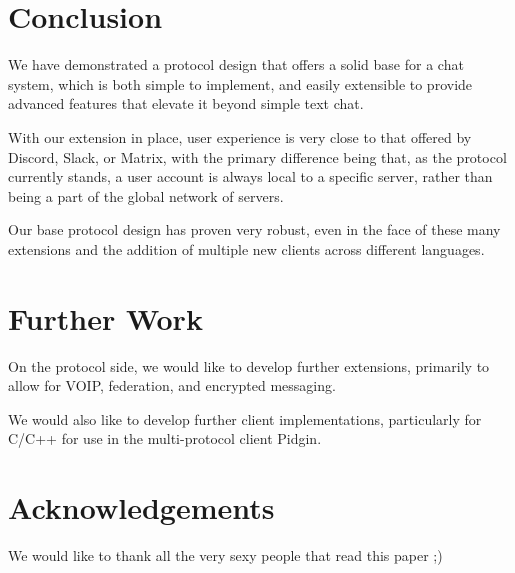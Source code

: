 \documentclass[format=sigconf]{acmart}
\begin{document}
\section{Conclusion}\label{conclusion}
We have demonstrated a protocol design that offers a solid base for a chat system, which is both simple to implement, and easily extensible to provide advanced features that elevate it beyond simple text chat.

With our extension in place, user experience is very close to that offered by Discord, Slack, or Matrix, with the primary difference being that, as the protocol currently stands, a user account is always local to a specific server, rather than being a part of the global network of servers.

Our base protocol design has proven very robust, even in the face of these many extensions and the addition of multiple new clients across different languages.

\section{Further Work}\label{further-work}
On the protocol side, we would like to develop further extensions, primarily to allow for VOIP, federation, and encrypted messaging.

We would also like to develop further client implementations, particularly for C/C++ for use in the multi-protocol client Pidgin.

\section{Acknowledgements}\label{acknowledgements}
We would like to thank all the very sexy people that read this paper ;)


\end{document}
